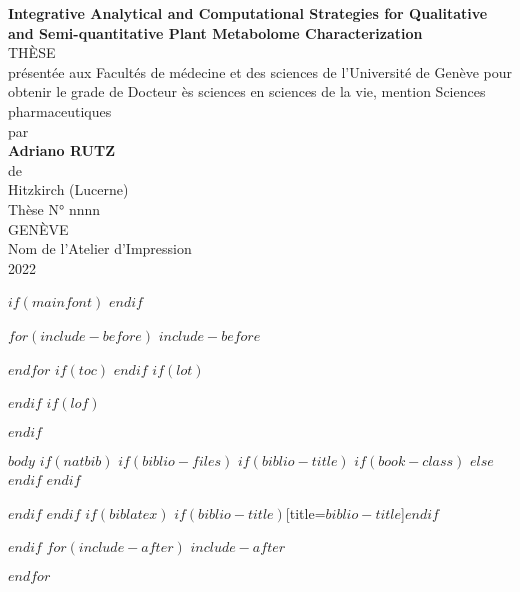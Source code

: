 \documentclass[$if(fontsize)$$fontsize$,$endif$$if(lang)$$lang$,$endif$$if(papersize)$$papersize$,$endif$$for(classoption)$$classoption$$sep$,$endfor$]{$documentclass$}
\begin{document}
\setmainfont{Arial}
\pagestyle{fancy}
\thispagestyle{firstpage}
\begin{center}
\singlespacing
\vspace*{3.0cm}
\large
\textbf{Integrative Analytical and Computational Strategies for Qualitative and Semi-quantitative Plant Metabolome Characterization}\\
\vspace{3.0cm}
\large
{THÈSE}\\
\vspace{0.5cm}
\normalsize
{présentée aux Facultés de médecine et des sciences de l'Université de Genève pour obtenir le grade de Docteur ès sciences en sciences de la vie, mention Sciences pharmaceutiques}\\
\vspace{2.0cm}
{par}\\
\large
\textbf{Adriano RUTZ}\\
\vspace{1.0cm}
\normalsize
{de\\
Hitzkirch (Lucerne)}\\
\vspace{3.0cm}
\normalsize
{Thèse N° nnnn}\\
\vspace{1.5cm}
{GENÈVE\\
Nom de l'Atelier d'Impression\\
2022}
\end{center}
$if(mainfont)$
    \setmainfont{$mainfont$}
$endif$

$for(include-before)$
$include-before$

$endfor$
$if(toc)$
{
\setcounter{tocdepth}{$toc-depth$}
\tableofcontents
}
$endif$
$if(lot)$
\listoftables
$endif$
$if(lof)$
\listoffigures
$endif$

$body$
$if(natbib)$
$if(biblio-files)$
$if(biblio-title)$
$if(book-class)$
\renewcommand\bibname{$biblio-title$}
$else$
\renewcommand\refname{$biblio-title$}
$endif$
$endif$


$endif$
$endif$
$if(biblatex)$
\printbibliography$if(biblio-title)$[title=$biblio-title$]$endif$

$endif$
$for(include-after)$
$include-after$

$endfor$
\end{document}
